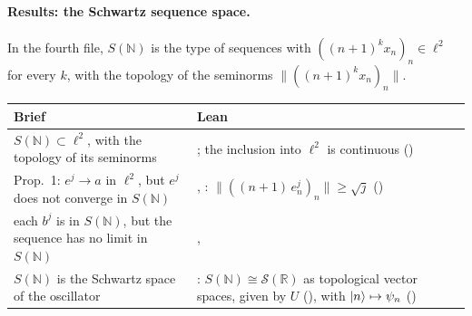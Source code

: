 \documentclass[11pt]{article}
\begin{document}
\paragraph{Results: the Schwartz sequence space.} In the fourth file, $S(\mathbb{N})$ is the
type  of sequences with $((n+1)^k x_n)_n \in \ell^2$ for every $k$, with the
topology of the seminorms $\|((n+1)^k x_n)_n\|$.
\begin{center}
\begin{tabularx}{\textwidth}{@{}BL@{}}
\toprule
Brief & Lean \\
\midrule
$S(\mathbb{N}) \subset \ell^2$, with the topology of its seminorms
  & ; the inclusion into $\ell^2$ is continuous
  () \\
Prop.~1: $e^j \to a$ in $\ell^2$, but $e^j$ does not converge in $S(\mathbb{N})$
  & , : $\|((n+1)\,e^j_n)_n\| \ge \sqrt{j}$
  () \\
each $b^j$ is in $S(\mathbb{N})$, but the sequence has no limit in $S(\mathbb{N})$
  & ,  \\
$S(\mathbb{N})$ is the Schwartz space of the oscillator & :
  $S(\mathbb{N}) \cong \mathcal{S}(\mathbb{R})$ as topological vector spaces, given by $U$
  (), with $\ket{n} \mapsto \psi_n$
  () \\
\bottomrule
\end{tabularx}
\end{center}
\end{document}
